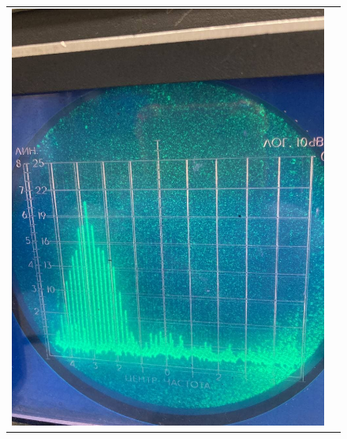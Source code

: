 \documentclass[a4paper, fontsize = 14pt]{article}
\begin{document}
\begin{figure}[hbt]
\centering
\begin{tabular}{cc}
\includegraphics[scale=0.25]{lab361ris5.png}

\end{tabular}
\end{figure}
\end{document}

